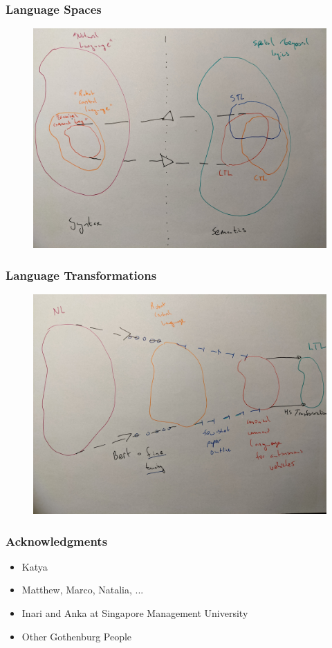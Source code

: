 \documentclass{beamer}
\begin{document}
\begin{frame}
\frametitle{Language Spaces}
\begin{figure}
\hspace*{-3mm}%
   \includegraphics[width= \paperwidth]{pics/one.jpg}
\end{figure}
\end{frame}

\begin{frame}
\frametitle{Language Transformations}
\begin{figure}
\hspace*{-3mm}%
   \includegraphics[width= \paperwidth]{pics/three.jpg}
\end{figure}
\end{frame}


\begin{frame}
\frametitle{Acknowledgments}
\begin{itemize}[<+->]
\item Katya
\item Matthew, Marco, Natalia, ...
\item Inari and Anka at Singapore Management University
\item Other Gothenburg People
\end{itemize}

\end{frame}
\end{document}

